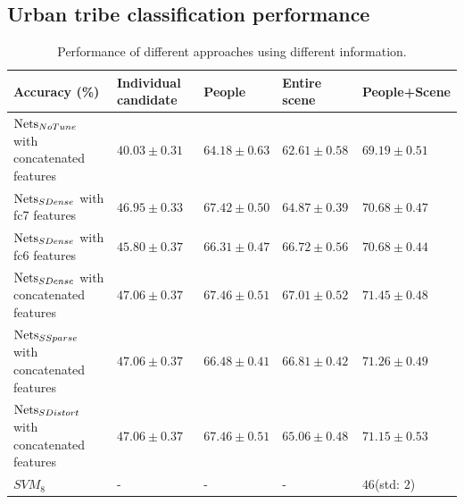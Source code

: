 \documentclass[10pt,twocolumn,letterpaper]{article}
\begin{document}
\subsection{Urban tribe classification performance}

\begin{table}[!t]
\centering
    \caption{Performance of different approaches using different information. }
    \label{table1}
    \begin{tabular}{l|l|l|l|l}
    \hline
    Accuracy (\%)                                          & Individual candidate & People & Entire scene & People+Scene \\ \hline

$\textup{Nets}_{NoTune}$   with concatenated features               & $40.03\pm0.31$                    & $64.18\pm0.63$      & $62.61\pm0.58$            & $69.19\pm0.51$            \\ \hline
    $\textup{Nets}_{SDense}$ with fc7 features & $46.95 \pm0.33$ & $67.42 \pm 0.50$      & $64.87 \pm0.39$            & $70.68\pm0.47$      \\ \hline
     $\textup{Nets}_{SDense}$ with fc6 features & $45.80 \pm0.37$ & $66.31 \pm 0.47$      & $66.72 \pm0.56$            & $70.68\pm0.44$      \\ \hline
     $\textup{Nets}_{SDense}$ with concatenated features     &  $\mathbf{47.06 \pm0.37}$ & $\mathbf{67.46 \pm 0.51}$      & $\mathbf{67.01 \pm0.52}$            & $\mathbf{71.45\pm0.48}$      \\ \hline
    $\textup{Nets}_{SSparse}$ with concatenated features               & $\mathbf{47.06 \pm0.37}$                    &$\mathbf{66.48  \pm 0.41}$        & $66.81\pm0.42$            & $71.26\pm0.49$            \\ \hline
    $\textup{Nets}_{SDistort}$ with concatenated features               &  $\mathbf{47.06 \pm0.37}$          &$\mathbf{67.46 \pm 0.51}$       & $65.06\pm0.48$            & $71.15\pm0.53$            \\ \hline
    $SVM_{8}$\cite{urbantribe2} & - & - & - & $46$(std: $2$)  \\ \hline


    \end{tabular}
\end{table}
\end{document}

